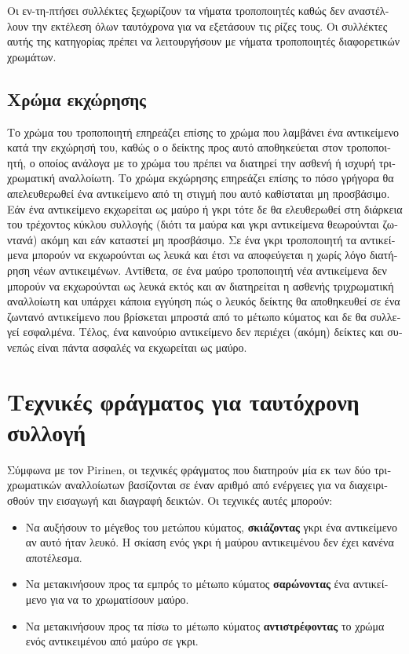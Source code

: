 \begin{greek}
Οι εν-τη-πτήσει συλλέκτες ξεχωρίζουν τα νήματα τροποποιητές
καθώς δεν αναστέλλουν την εκτέλεση όλων ταυτόχρονα για να
εξετάσουν τις ρίζες τους. Οι συλλέκτες αυτής της κατηγορίας
πρέπει να λειτουργήσουν με νήματα τροποποιητές διαφορετικών
χρωμάτων.

\subsection{Χρώμα εκχώρησης}
Το χρώμα του τροποποιητή επηρεάζει επίσης το χρώμα που
λαμβάνει ένα αντικείμενο κατά την εκχώρησή του, καθώς ο
ο δείκτης προς αυτό αποθηκεύεται στον τροποποιητή, ο οποίος
ανάλογα με το χρώμα του πρέπει να διατηρεί την ασθενή ή
ισχυρή τριχρωματική αναλλοίωτη. Το χρώμα εκχώρησης επηρεάζει
επίσης το πόσο γρήγορα θα απελευθερωθεί ένα αντικείμενο από
τη στιγμή που αυτό καθίσταται μη προσβάσιμο. Εάν ένα αντικείμενο
εκχωρείται ως μαύρο ή γκρι τότε δε θα ελευθερωθεί στη διάρκεια
του τρέχοντος κύκλου συλλογής (διότι τα μαύρα και γκρι αντικείμενα
θεωρούνται ζωντανά) ακόμη και εάν καταστεί μη προσβάσιμο.
Σε ένα γκρι τροποποιητή τα αντικείμενα μπορούν να εκχωρούνται
ως λευκά και έτσι να αποφεύγεται η χωρίς λόγο διατήρηση
νέων αντικειμένων. Αντίθετα, σε ένα μαύρο τροποποιητή νέα
αντικείμενα δεν μπορούν να εκχωρούνται ως λευκά εκτός και
αν διατηρείται η ασθενής τριχρωματική αναλλοίωτη και υπάρχει
κάποια εγγύηση πώς ο λευκός δείκτης θα αποθηκευθεί σε
ένα ζωντανό αντικείμενο που βρίσκεται μπροστά από το μέτωπο
κύματος και δε θα συλλεγεί εσφαλμένα. Τέλος, ένα καινούριο
αντικείμενο δεν περιέχει (ακόμη) δείκτες και συνεπώς
είναι πάντα ασφαλές να εκχωρείται ως μαύρο.

\section{Τεχνικές φράγματος για ταυτόχρονη συλλογή}
Σύμφωνα με τον Pirinen, \cite{DBLP:conf/iwmm/Pirinen98} οι
τεχνικές φράγματος που διατηρούν μία εκ των δύο τριχρωματικών
αναλλοίωτων βασίζονται σε έναν αριθμό από ενέργειες για να
διαχειρισθούν την εισαγωγή και διαγραφή δεικτών. Οι τεχνικές
αυτές μπορούν:
\begin{itemize}
\item Να αυξήσουν το μέγεθος του μετώπου κύματος, \textbf{σκιάζοντας}
  γκρι ένα αντικείμενο αν αυτό ήταν λευκό. Η σκίαση ενός γκρι
  ή μαύρου αντικειμένου δεν έχει κανένα αποτέλεσμα.
\item Να μετακινήσουν προς τα εμπρός το μέτωπο κύματος \textbf{σαρώνοντας}
  ένα αντικείμενο για να το χρωματίσουν μαύρο.
\item Να μετακινήσουν προς τα πίσω το μέτωπο κύματος \textbf{αντιστρέφοντας}
  το χρώμα ενός αντικειμένου από μαύρο σε γκρι.
\end{itemize}


\end{greek}
